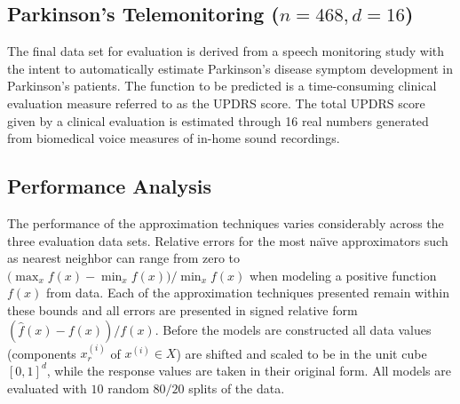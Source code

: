 \subsection{Parkinson's Telemonitoring ($n = 468, d = 16$)}
The final data set for evaluation \cite{tsanas2010accurate} is derived from a speech monitoring study with the intent to automatically estimate Parkinson's disease symptom development in Parkinson's patients. The function to be predicted is a time-consuming clinical evaluation measure referred to as the UPDRS score. The total UPDRS score given by a clinical evaluation is estimated through 16 real numbers generated from biomedical voice measures of in-home sound recordings.

\subsection{Performance Analysis}
\label{sec_performance_analysis}

The performance of the approximation techniques varies considerably across the three evaluation data sets. Relative errors for the most na\"{\i}ve approximators such as nearest neighbor can range from zero to $\displaystyle \big(\max_x f(x) - \min_x f(x)\big) / \min_x f(x)$ when modeling a positive function $f(x)$ from data. Each of the approximation techniques presented remain within these bounds and all errors are presented in signed relative form $(\hat f(x) - f(x)) / f(x)$. Before the models are constructed all data values (components $x^{(i)}_r$ of $x^{(i)} \in X$) are shifted and scaled to be in the unit cube $[0,1]^d$, while the response values are taken in their original form. All models are evaluated with $10$ random $80/20$ splits of the data.

